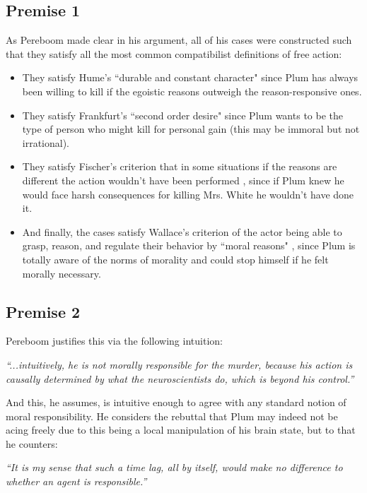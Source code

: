 \documentclass{article}
\begin{document}
\subsection{Premise 1}
As Pereboom made clear in his argument, all of his cases were constructed such that they satisfy all the most common compatibilist definitions of free action:
\begin{itemize}
  \item They satisfy Hume's ``durable and constant character" \cite{hume} since Plum has always been willing to kill if the egoistic reasons outweigh the reason-responsive ones.
  \item They satisfy Frankfurt's ``second order desire" \cite{frankfurt} since Plum wants to be the type of person who might kill for personal gain (this may be immoral but not irrational).
  \item They satisfy Fischer's criterion that in some situations if the reasons are different the action wouldn't have been performed \cite{fischer}, since if Plum knew he would face harsh consequences for killing Mrs. White he wouldn't have done it.
  \item And finally, the cases satisfy Wallace's criterion of the actor being able to grasp, reason, and regulate their behavior by ``moral reasons" \cite{wallace}, since Plum is totally aware of the norms of morality and could stop himself if he felt morally necessary.
\end{itemize}

\subsection{Premise 2}
Pereboom justifies this via the following intuition:
\begin{displayquote}
  \textit{``...intuitively, he is not morally responsible for the murder, because his action is causally determined by what the neuroscientists do, which is beyond his control.''}
\end{displayquote}

And this, he assumes, is intuitive enough to agree with any standard notion of moral responsibility. He considers the rebuttal that Plum may indeed not be acing freely due to this being a local manipulation of his brain state, but to that he counters:
\begin{displayquote}
  \textit{``It is my sense that such a time lag, all by itself, would make no difference to whether an agent is responsible.''}
\end{displayquote}
\end{document}

